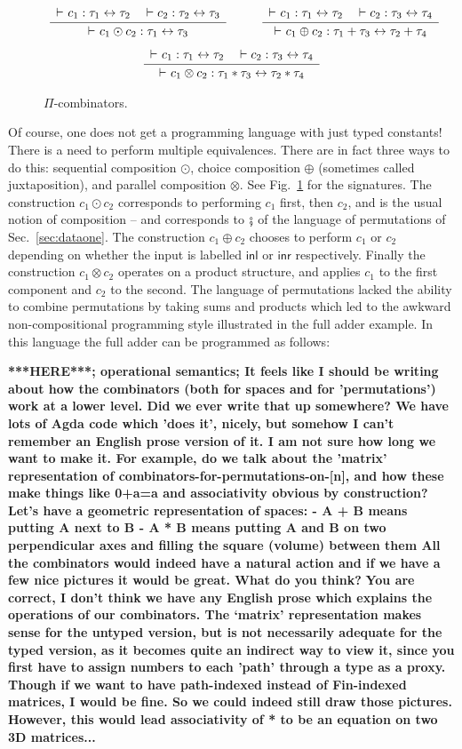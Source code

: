 \documentclass{article}
\newcommand{\iso}{\leftrightarrow}
\newcommand{\proves}{\vdash}
\newcommand{\Rule}[4]{
\makebox{{\rm #1}
$\displaystyle
\frac{\begin{array}{l}#2 \\\end{array}}
{\begin{array}{l}#3      \\\end{array}}$
 #4}}
\newcommand{\jdg}[3]{#2 \proves_{#1} #3}
\newcommand{\amr}[1]{\fbox{Amr says:} \textbf{#1}}
\newcommand{\jc}[1]{\fbox{Jacques says:} \textbf{#1}}
\begin{document}
\begin{figure}[t]
\[
\Rule{}
{\jdg{}{}{c_1 : \tau_1 \iso \tau_2} \quad \vdash c_2 : \tau_2 \iso \tau_3}
{\jdg{}{}{c_1 \odot c_2 : \tau_1 \iso \tau_3}}
{}
\qquad
\Rule{}
{\jdg{}{}{c_1 : \tau_1 \iso \tau_2} \quad \vdash c_2 : \tau_3 \iso \tau_4}
{\jdg{}{}{c_1 \oplus c_2 : \tau_1 + \tau_3 \iso \tau_2 + \tau_4}}
{}
\]
\[
\Rule{}
{\jdg{}{}{c_1 : \tau_1 \iso \tau_2} \quad \vdash c_2 : \tau_3 \iso \tau_4}
{\jdg{}{}{c_1 \otimes c_2 : \tau_1 * \tau_3 \iso \tau_2 * \tau_4}}
{}
\]
\caption{$\Pi$-combinators.}
\label{pi-combinators}
\end{figure}

Of course, one does not get a programming language with just typed
constants! There is a need to perform multiple equivalences. There are
in fact three ways to do this: sequential composition $\odot$, choice
composition $\oplus$ (sometimes called juxtaposition), and parallel
composition $\otimes$. See Fig.~\ref{pi-combinators} for the
signatures. The construction $c_1 \odot c_2$ corresponds to performing
$c_1$ first, then $c_2$, and is the usual notion of composition -- and
corresponds to $\fatsemi$ of the language of permutations of
Sec.~\ref{sec:dataone}. The construction $c_1 \oplus c_2$ chooses to
perform $c_1$ or $c_2$ depending on whether the input is labelled
$\textsf{inl}$ or $\textsf{inr}$ respectively. Finally the
construction $c_1 \otimes c_2$ operates on a product structure, and
applies $c_1$ to the first component and $c_2$ to the second. The
language of permutations lacked the ability to combine permutations by
taking sums and products which led to the awkward non-compositional
programming style illustrated in the full adder example. In this
language the full adder can be programmed as follows:

\amr{***HERE***; operational semantics; It feels like I should be
  writing about how the combinators (both for spaces and for
  'permutations') work at a lower level. Did we ever write that up
  somewhere?  We have lots of Agda code which 'does it', nicely, but
  somehow I can't remember an English prose version of it. I am not
  sure how long we want to make it.  For example, do we talk about the
  'matrix' representation of combinators-for-permutations-on-[n], and
  how these make things like 0+a=a and associativity obvious by
  construction?
  Let’s have a geometric representation of spaces:
- A + B means putting A next to B
- A * B means putting A and B on two perpendicular axes and filling the square (volume) between them
All the combinators would indeed have a natural action and if we have
a few nice pictures it would be great. What do you think? }
\jc{You are correct, I don't think we have any English prose which
explains the operations of our combinators. The `matrix' representation
makes sense for the untyped version, but is not necessarily adequate for
the typed version, as it becomes quite an indirect way to view it, since you
first have to assign numbers to each 'path' through a type as a proxy.
Though if we want to have path-indexed instead of Fin-indexed matrices,
I would be fine. So we could indeed still draw those pictures.  However,
this would lead associativity of * to be an equation on two 3D matrices...}
\end{document}
